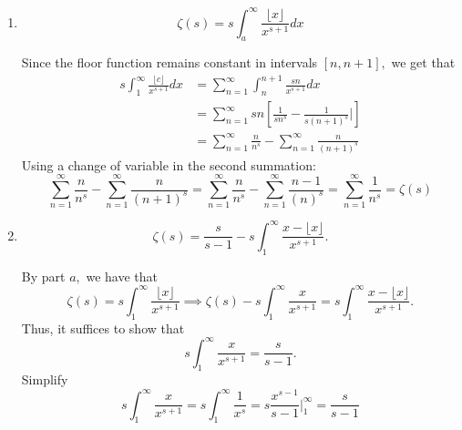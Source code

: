 \documentclass[11pt]{article}
\begin{document}
    \begin{enumerate}
        \item 
        \begin{problem}
            \[\zeta(s) = s\int_a^\infty \frac{\lfloor x\rfloor}{x^{s+1}}dx\]
        \end{problem}
        \begin{solution}
        Since the floor function remains constant in intervals $[n, n+1],$ we get that
        \begin{align*}
            s\int_1^\infty \frac{\lfloor c \rfloor}{x^{s+1}}dx &= \sum_{n=1}^\infty \int_n^{n+1}\frac{sn}{x^{s+1}}dx\\
            &= \sum_{n=1}^\infty sn\left[\frac{1}{sn^s} - \frac{1}{s(n+1)^s}| \right]\\
            &= \sum_{n=1}^\infty \frac{n}{n^s} - \sum_{n=1}^\infty \frac{n}{(n+1)^s}
        \end{align*}
            Using a change of variable in the second summation:
            \[\sum_{n=1}^\infty \frac{n}{n^s} - \sum_{n=1}^\infty \frac{n}{(n+1)^s} = \sum_{n=1}^\infty \frac{n}{n^s} - \sum_{n=1}^\infty \frac{n-1}{(n)^s} = \sum_{n=1}^\infty \frac{1}{n^s} = \zeta(s)\]
        \end{solution}
        \item 
        \begin{problem}
            \[\zeta(s) = \frac{s}{s-1} - s\int_1^\infty \frac{x - \lfloor x \rfloor }{x^{s+1}}.\]
        \end{problem}
        \begin{solution}
            By part $a,$ we have that 
            \[\zeta(s) = s\int_1^\infty \frac{\lfloor x\rfloor}{x^{s+1}} \implies \zeta(s) - s\int_1^\infty \frac{x}{x^{s+1}} = s\int_1^\infty \frac{x - \lfloor x \rfloor }{x^{s+1}}.\] Thus, it suffices to show that 
            \[s\int_1^\infty \frac{x}{x^{s+1}} = \frac{s}{s-1}.\] Simplify
            \[s\int_1^\infty \frac{x}{x^{s+1}} = s\int_1^\infty \frac{1}{x^s} = s\frac{x^{s-1}}{s-1}\bigg|_1^\infty = \frac{s}{s-1}\]
        \end{solution}
    \end{enumerate}
\newpage
\end{document}
